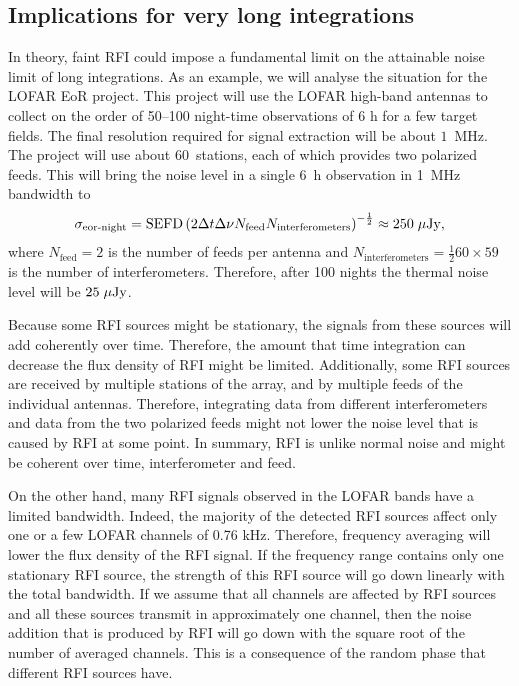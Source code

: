 \documentclass[useAMS,usenatbib]{mn2e}
\begin{document}
\subsection{Implications for very long integrations}
In theory, faint RFI could impose a fundamental limit on the attainable noise limit of long integrations. As an example, we will analyse the situation for the LOFAR EoR project. This project will use the LOFAR high-band antennas to collect on the order of 50--100 night-time observations of 6 h for a few target fields. The final resolution required for signal extraction will be about $1$~MHz. The project will use about $60$~stations, each of which provides two polarized feeds. This will bring the noise level in a single 6~h observation in 1~MHz bandwidth to
\begin{equation}
 \sigma_\textrm{eor-night} = \textrm{SEFD} \left(2\Delta t \Delta \nu N_\textrm{feed} N_\textrm{interferometers} \right)^{-\frac{1}{2}} \approx 250\hspace{1mm} \mu\textrm{Jy},
\end{equation}
where $N_\textrm{feed}=2$ is the number of feeds per antenna and $N_\textrm{interferometers}=\frac{1}{2}60\times59$ is the number of interferometers. Therefore, after 100 nights the thermal noise level will be $25\hspace{1mm}\mu\textrm{Jy}$.

Because some RFI sources might be stationary, the signals from these sources will add coherently over time. Therefore, the amount that time integration can decrease the flux density of RFI might be limited. Additionally, some RFI sources are received by multiple stations of the array, and by multiple feeds of the individual antennas. Therefore, integrating data from different interferometers and data from the two polarized feeds might not lower the noise level that is caused by RFI at some point. In summary, RFI is unlike normal noise and might be coherent over time, interferometer and feed.

On the other hand, many RFI signals observed in the LOFAR bands have a limited bandwidth. Indeed, the majority of the detected RFI sources affect only one or a few LOFAR channels of 0.76 kHz. Therefore, frequency averaging will lower the flux density of the RFI signal. If the frequency range contains only one stationary RFI source, the strength of this RFI source will go down linearly with the total bandwidth. If we assume that all channels are affected by RFI sources and all these sources transmit in approximately one channel, then the noise addition that is produced by RFI will go down with the square root of the number of averaged channels. This is a consequence of the random phase that different RFI sources have.
\end{document}

